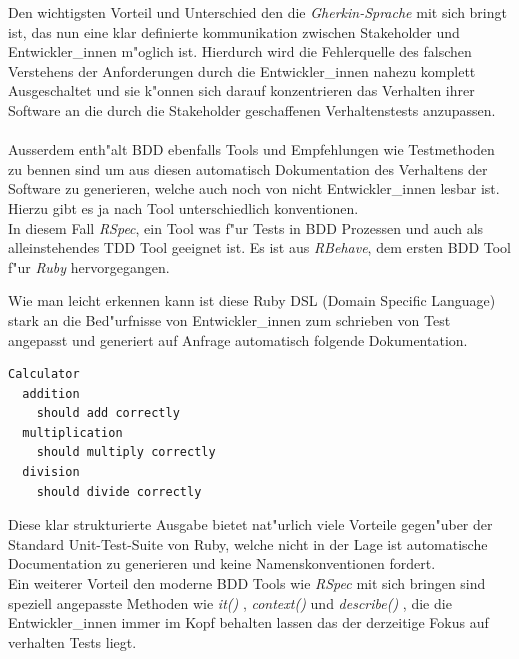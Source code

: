       Den wichtigsten Vorteil und Unterschied den die {\em Gherkin-Sprache} 
      mit sich bringt ist, das nun eine klar definierte kommunikation zwischen 
      Stakeholder und Entwickler\_innen m"oglich ist. Hierdurch wird die 
      Fehlerquelle des falschen Verstehens der Anforderungen durch die 
      Entwickler\_innen nahezu komplett Ausgeschaltet und sie k"onnen sich darauf
      konzentrieren das Verhalten ihrer Software an die durch die Stakeholder
      geschaffenen Verhaltenstests anzupassen.\\\\

      Ausserdem enth"alt BDD ebenfalls Tools und Empfehlungen wie Testmethoden
      zu bennen sind um aus diesen automatisch Dokumentation des Verhaltens 
      der Software zu generieren, welche auch noch von nicht Entwickler\_innen
      lesbar ist. Hierzu gibt es ja nach Tool unterschiedlich konventionen.\\
      In diesem Fall {\em RSpec}\cite{Rspec}, ein Tool was f"ur Tests in BDD 
      Prozessen und auch als alleinstehendes TDD Tool geeignet ist. Es ist aus 
      {\em RBehave}\cite{North:2007}, dem ersten BDD Tool f"ur {\em Ruby} hervorgegangen.
      
      Wie man leicht erkennen kann ist diese Ruby DSL (Domain Specific Language)
      stark an die Bed"urfnisse von Entwickler\_innen zum schrieben von Test
      angepasst und generiert auf Anfrage automatisch folgende Dokumentation.
      \begin{lstlisting}[caption=RSpec Documentation Ausgabe]
Calculator
  addition
    should add correctly
  multiplication
    should multiply correctly
  division
    should divide correctly
      \end{lstlisting}
      Diese klar strukturierte Ausgabe bietet nat"urlich viele Vorteile gegen"uber
      der Standard Unit-Test-Suite von Ruby, welche nicht in der Lage ist 
      automatische Documentation zu generieren und keine Namenskonventionen 
      fordert.\\
      Ein weiterer Vorteil den moderne BDD Tools wie {\em RSpec } mit sich bringen
      sind speziell angepasste Methoden wie {\em it() }, {\em context()} und 
      {\em describe() }, die die Entwickler\_innen immer im Kopf behalten lassen
      das der derzeitige Fokus auf verhalten Tests liegt.

